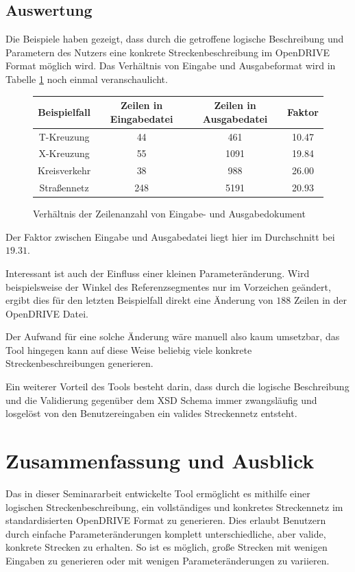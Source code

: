 \section{Auswertung}

Die Beispiele haben gezeigt, dass durch die getroffene logische Beschreibung und Parametern des Nutzers eine konkrete Streckenbeschreibung im OpenDRIVE Format möglich wird. Das Verhältnis von Eingabe und Ausgabeformat wird in Tabelle \ref{tab1} noch einmal veranschaulicht.
\begin{figure}
\centering
\begin{tabular}{c|c|c|c}
\toprule
\textbf{Beispielfall} & Zeilen in Eingabedatei & Zeilen in Ausgabedatei & Faktor \\
\midrule
T-Kreuzung & 44 & 461 & 10.47\\
X-Kreuzung & 55 & 1091 & 19.84\\
Kreisverkehr & 38 & 988 & 26.00\\
Straßennetz & 248 & 5191 & 20.93 \\
\bottomrule
\end{tabular}
\caption{Verhältnis der Zeilenanzahl von Eingabe- und Ausgabedokument}
\label{tab1}
\end{figure}

Der Faktor zwischen Eingabe und Ausgabedatei liegt hier im Durchschnitt bei \(19.31\).

Interessant ist auch der Einfluss einer kleinen Parameteränderung. Wird beispielsweise der Winkel des Referenzsegmentes nur im Vorzeichen geändert, ergibt dies für den letzten Beispielfall direkt eine Änderung von \(188\) Zeilen in der OpenDRIVE Datei.

Der Aufwand für eine solche Änderung wäre manuell also kaum umsetzbar, das Tool hingegen kann auf diese Weise beliebig viele konkrete Streckenbeschreibungen generieren.

Ein weiterer Vorteil des Tools besteht darin, dass durch die logische Beschreibung und die Validierung gegenüber dem XSD Schema immer zwangsläufig und losgelöst von den Benutzereingaben ein valides Streckennetz entsteht.

\chapter{Zusammenfassung und Ausblick}

Das in dieser Seminararbeit entwickelte Tool ermöglicht es mithilfe einer logischen Streckenbeschreibung, ein vollständiges und konkretes Streckennetz im standardisierten OpenDRIVE Format zu generieren. Dies erlaubt Benutzern durch einfache Parameteränderungen komplett unterschiedliche, aber valide, konkrete Strecken zu erhalten. So ist es möglich, große Strecken mit wenigen Eingaben zu generieren oder mit wenigen Parameteränderungen zu variieren.

